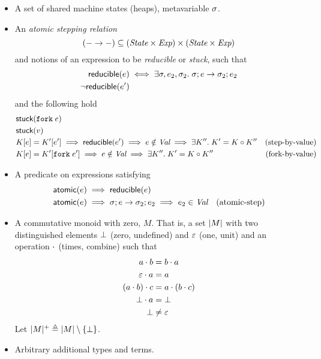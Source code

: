 \begin{itemize}
\item A set  of shared machine states (\eg heaps), metavariable $\sigma$.
\item An \emph{atomic stepping relation} \[
  (- \rightarrow -) \subseteq (\textit{State} \times \textit{Exp}) \times (\textit{State} \times \textit{Exp})
\]
and notions of an expression to be \emph{reducible} or \emph{stuck}, such that
\begin{align*}
  \textlog{reducible}(\expr) &\iff \Exists \state, \expr_2, \state_2. \cfg{\state}{\expr} \step \cfg{\state_2}{\expr_2} \\
   \lnot \textlog{reducible}(\expr')
\end{align*}
and the following hold
\begin{align*}
&\textlog{stuck}(\fork{\expr})& \\
 &\textlog{stuck}(\val)&\\
 &\ectx[\expr] = \ectx'[\expr'] \implies \textlog{reducible}(\expr') \implies
  \expr \notin \textdom{Val} \implies \Exists \ectx''. \ectx' = \ectx \circ \ectx'' &\mbox{(step-by-value)} \\
 &\ectx[\expr] = \ectx'[\fork{\expr'}] \implies
  \expr \notin \textdom{Val} \implies \Exists \ectx''. \ectx' = \ectx \circ \ectx'' &\mbox{(fork-by-value)} \\
\end{align*}

\item A predicate  on expressions satisfying
  \begin{align*}
   &\textsf{atomic}(e) \implies \textsf{reducible}(e) &\\
   &\textsf{atomic}(e) \implies {\sigma};{e} \rightarrow {\sigma_2};{e_2} \implies e_2 \in \textit{Val} &\mbox{(atomic-step)}
  \end{align*}


\item A commutative monoid with zero, $M$.
That is, a set $|M|$ with two distinguished elements $\bot$ (zero, undefined) and $\mathord{\varepsilon}$ (one, unit) and an operation $\mathbin{\cdot}$ (times, combine) such that
\begin{align*}
 a \mathbin{\cdot} b &= b \mathbin{\cdot} a \\
 \mathord{\varepsilon} \mathbin{\cdot} a &= a \\
 (a \mathbin{\cdot} b) \mathbin{\cdot} c &= a \mathbin{\cdot} (b \mathbin{\cdot} c) \\
 \bot \mathbin{\cdot} a &= \bot \\
 \bot &\neq \mathord{\varepsilon}
\end{align*}
Let $|M|^{+} \triangleq |M| \setminus \{\bot\}$.

\item Arbitrary additional types and terms.
\end{itemize}

